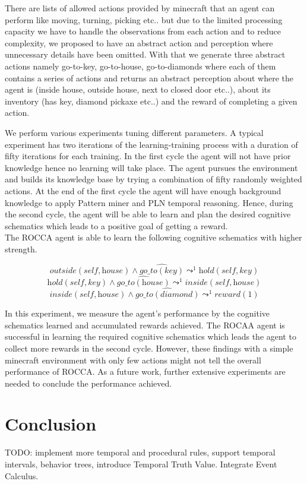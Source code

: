 \documentclass[runningheads]{llncs}
\newcommand{\lpreimp}[1]{\leadsto^{#1}}
\newcommand{\ldo}[1]{\widehat{#1}}
\begin{document}
There are lists of allowed actions provided by minecraft that an agent can perform like moving, turning, picking etc.. but due to the limited processing capacity we have to handle the observations from each action and to reduce complexity, we proposed to have an abstract action and perception where unnecessary details have been omitted. With that we generate three abstract actions namely go-to-key, go-to-house, go-to-diamonds where each of them contains a series of actions and returns an abstract perception about where the agent is (inside house, outside house, next to closed door etc..), about its inventory (has key, diamond pickaxe etc..) and the reward of completing a given action. \par
We perform various experiments tuning different parameters. A typical experiment has two iterations of the learning-training process with a duration of fifty iterations for each training. In the first cycle the agent will not have prior knowledge hence no learning will take place. The agent pursues the environment and builds its knowledge base by trying a combination of fifty randomly weighted actions. At the end of the first cycle the agent will have enough background knowledge to apply Pattern miner and PLN temporal reasoning. Hence, during the second cycle, the agent will be able to learn and plan the desired cognitive schematics which leads to a positive goal of getting a reward.\\
The ROCCA agent is able to learn the following cognitive schematics with higher strength.

$$\textit{outside}(\textit{self}, \textit{house}) \land \ldo{\textit{go\_to}(\textit{key})} \lpreimp{1} \textit{hold}(\textit{self}, \textit{key})$$
$$\textit{hold}(\textit{self}, \textit{key}) \land \ldo{\textit{go\_to}(\textit{house})} \lpreimp{1} \textit{inside}(\textit{self}, \textit{house})$$
$$\textit{inside}(\textit{self}, \textit{house}) \land \ldo{\textit{go\_to}(\textit{diamond})} \lpreimp{1} \textit{reward}(1)$$

In this experiment, we measure the agent's performance by the cognitive schematics learned and accumulated rewards achieved. The ROCAA agent is successful in learning the required cognitive schematics which leads the agent to collect more rewards in the second cycle. However, these findings with a simple minecraft environment with only few actions might not tell the overall performance of ROCCA. As a future work, further extensive experiments are needed to conclude the performance achieved.

\section{Conclusion}

TODO: implement more temporal and procedural rules, support temporal
intervals, behavior trees, introduce Temporal Truth Value.  Integrate
Event Calculus.

%
%
 
\end{document}

